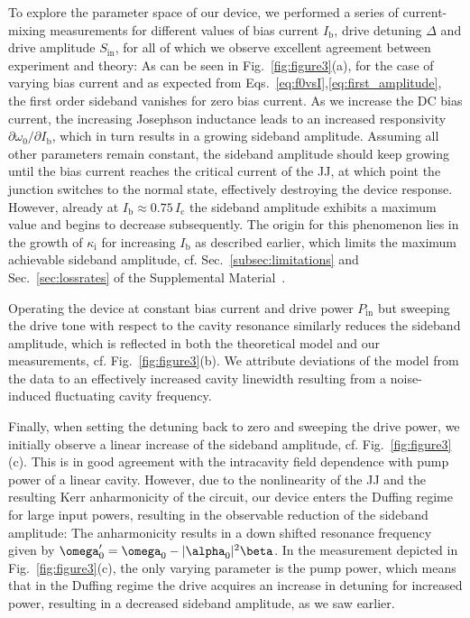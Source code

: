 % 
To explore the parameter space of our device, we performed a series of current-mixing measurements for different values of bias current $I_\text{b}$, drive detuning $\Delta$ and drive amplitude $S_\text{in}$, for all of which we observe excellent agreement between experiment and theory:
% 
As can be seen in Fig.~\ref{fig:figure3}(a), for the case of varying bias current and as expected from Eqs.~\eqref{eq:f0vsI},\eqref{eq:first_amplitude}, the first order sideband vanishes for zero bias current.
% 
As we increase the DC bias current, the increasing Josephson inductance leads to an increased responsivity $\partial\omega_0/\partial I_\text{b}$, which in turn results in a growing sideband amplitude.
% 
Assuming all other parameters remain constant, the sideband amplitude should keep growing until the bias current reaches the critical current of the JJ, at which point the junction switches to the normal state, effectively destroying the device response.
% 
However, already at $I_\text{b} \approx 0.75 \,I_\text{c}$ the sideband amplitude exhibits a maximum value and begins to decrease subsequently.
% 
The origin for this phenomenon lies in the growth of $\kappa_\text{i}$ for increasing $I_\text{b}$ as described earlier, which limits the maximum achievable sideband amplitude, cf. Sec.~\ref{subsec:limitations} and Sec.~\ref{sec:lossrates} of the Supplemental Material~\cite{SeeSupplementalMaterial}.

Operating the device at constant bias current and drive power $P_\text{in}$ but sweeping the drive tone with respect to the cavity resonance similarly reduces the sideband amplitude, which is reflected in both the theoretical model and our measurements, cf. Fig.~\ref{fig:figure3}(b).
% 
We attribute deviations of the model from the data to an effectively increased cavity linewidth resulting from a noise-induced fluctuating cavity frequency.

Finally, when setting the detuning back to zero and sweeping the drive power, we initially observe a linear increase of the sideband amplitude, cf. Fig.~\ref{fig:figure3}(c).
% 
This is in good agreement with the intracavity field dependence with pump power of a linear cavity.
% 
However, due to the nonlinearity of the JJ and the resulting Kerr anharmonicity of the circuit, our device enters the Duffing regime for large input powers, resulting in the observable reduction of the sideband amplitude:
% 
The anharmonicity results in a down shifted resonance frequency given by $\omega_0' = \omega_0-\abs{\alpha_0}^2\beta$.
% 
In the measurement depicted in Fig.~\ref{fig:figure3}(c), the only varying parameter is the pump power, which means that in the Duffing regime the drive acquires an increase in detuning for increased power, resulting in a decreased sideband amplitude, as we saw earlier.

